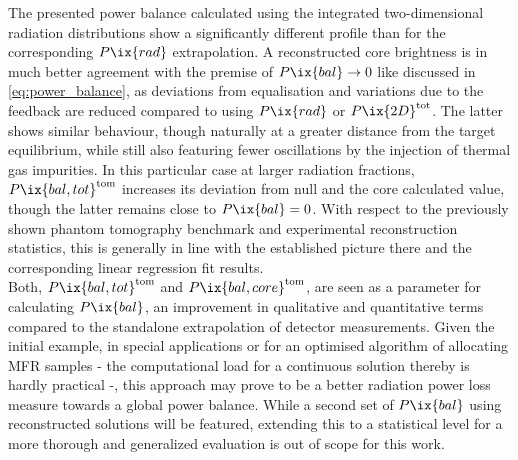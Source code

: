                    The presented power balance calculated using the integrated two-dimensional radiation distributions show a significantly different profile than for the corresponding $P\ix{rad}$ extrapolation. A reconstructed core brightness is in much better agreement with the premise of $P\ix{bal}\rightarrow0$ like discussed in \cref{eq:power_balance}, as deviations from equalisation and variations due to the feedback are reduced compared to using $P\ix{rad}$ or $P\ix{2D}^{\text{tot}}$. The latter shows similar behaviour, though naturally at a greater distance from the target equilibrium, while still also featuring fewer oscillations by the injection of thermal gas impurities. In this particular case at larger radiation fractions, $P\ix{bal,tot}^{\text{tom}}$ increases its deviation from null and the core calculated value, though the latter remains close to $P\ix{bal}=0$. With respect to the previously shown phantom tomography benchmark and experimental reconstruction statistics, this is generally in line with the established picture there and the corresponding linear regression fit results.\\%
                    Both, $P\ix{bal,tot}^{\text{tom}}$ and $P\ix{bal,core}^{\text{tom}}$, are seen as a parameter for calculating $P\ix{bal}$, an improvement in qualitative and quantitative terms compared to the standalone extrapolation of detector measurements. Given the initial example, in special applications or for an optimised algorithm of allocating MFR samples - the computational load for a continuous solution thereby is hardly practical -, this approach may prove to be a better radiation power loss measure towards a global power balance. While a second set of $P\ix{bal}$ using reconstructed solutions will be featured, extending this to a statistical level for a more thorough and generalized evaluation is out of scope for this work.\\%
                    \newline%
%
